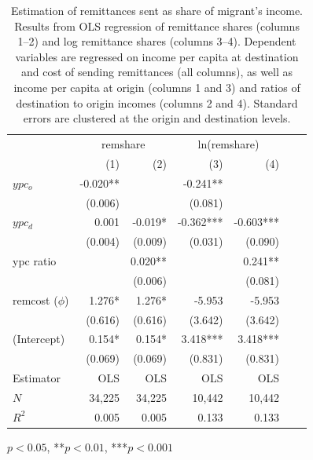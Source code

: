 \documentclass[letterpaper,11pt]{article}
\begin{document}
\begin{table}[H]
	\centering
	\begin{threeparttable}
		\begin{tabular}{lrrrrrr}
			\toprule
			                &   \multicolumn{2}{c}{remshare}   &  \multicolumn{2}{c}{ln(remshare)} \\
			\cmidrule(lr){2-3} \cmidrule(lr){4-5}
				             &      (1) &               (2) &       (3) &                  (4) \\
			\midrule
			$ypc_{o}$       & -0.020** &                   &  -0.241** &                      \\
				             &  (0.006) &                   &   (0.081) &                      \\
			$ypc_{d}$       &    0.001 &           -0.019* & -0.362*** &            -0.603*** \\
				             &  (0.004) &           (0.009) &   (0.031) &              (0.090) \\
			ypc ratio      &          &           0.020** &           &              0.241** \\
				             &          &           (0.006) &           &              (0.081) \\
			remcost ($\phi$)    &   1.276* &            1.276* &    -5.953 &               -5.953 \\
				             &  (0.616) &           (0.616) &   (3.642) &              (3.642) \\
			(Intercept)     &   0.154* &            0.154* &  3.418*** &             3.418*** \\
				             &  (0.069) &           (0.069) &   (0.831) &              (0.831) \\
			\midrule
			Estimator       &      OLS &       OLS &       OLS &       OLS  \\
			\midrule
			$N$             &   34,225 &    34,225 &     10,442 &    10,442  \\
			$R^2$        &    0.005 &             0.005 &     0.133 &                0.133 \\
			\bottomrule
		\end{tabular}
		\begin{tablenotes}
			\item *$p<0.05$, **$p<0.01$, ***$p<0.001$
		\end{tablenotes}
	\end{threeparttable}
	\caption{Estimation of remittances sent as share of migrant's income. Results from OLS regression of remittance shares (columns 1--2) and log remittance shares (columns 3--4). Dependent variables are regressed on income per capita at destination and cost of sending remittances (all columns), as well as income per capita at origin (columns 1 and 3) and ratios of destination to origin incomes (columns 2 and 4). Standard errors are clustered at the origin and destination levels.}
	\label{table:rhoest}
\end{table}
\end{document}
